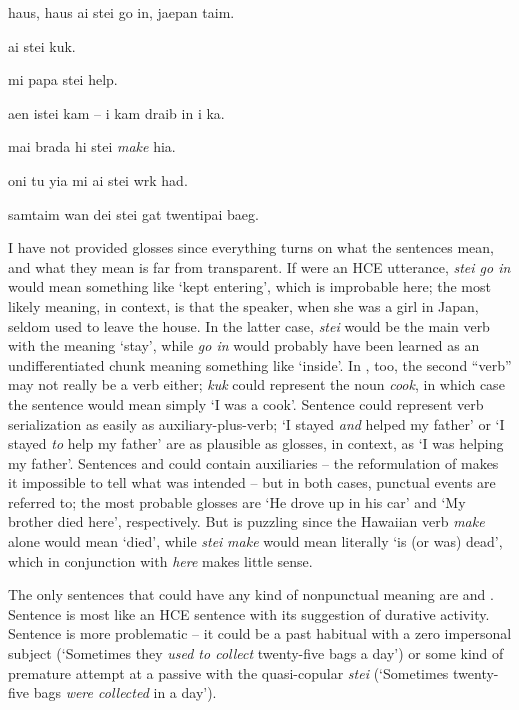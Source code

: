 \ea\label{ex:45}
 haus, haus ai stei go in, jaepan taim.
\z

\ea\label{ex:46}
 ai stei kuk.
\z

\ea\label{ex:47}
 mi papa stei help.
\z

\ea\label{ex:48}
 aen istei kam -- i kam draib in i ka.
\z

\ea\label{ex:49}
 mai brada hi stei \textit{make} hia.
\z

\ea\label{ex:50}
oni tu yia mi ai stei wrk had.
\z

\ea\label{ex:51}
samtaim wan dei stei gat twentipai baeg.
\z

\noindent I have not provided glosses since everything turns on what the sentences mean, and what they mean is far from transparent. If  were an HCE utterance, \textit{stei go in} would mean something like `kept entering', which is improbable here; the most likely meaning, in context, is that the speaker, when she was a girl in Japan, seldom used to leave the house. In the latter case, \textit{stei} would be the main verb with the meaning `stay', while \textit{go in} would probably have been learned as an undifferentiated chunk meaning something like `inside'. In , too, the second ``verb'' may not really be a verb either; \textit{kuk} could represent the noun \textit{cook}, in which case the sentence would mean simply `I was a cook'. Sentence  could represent verb serialization as easily as auxiliary-plus-verb; `I stayed \textit{and} helped my father' or `I stayed \textit{to} help my father' are as plausible as glosses, in context, as `I was helping my father'. Sentences  and  could contain auxiliaries -- the reformu\-lation of  makes it impossible to tell what was intended -- but in both cases, punctual events are referred to; the most probable glosses are `He drove up in his car' and `My brother died here', respectively. But  is puzzling since the Hawaiian verb \textit{make} alone would mean `died', while \textit{stei} \textit{make} would mean literally `is (or was) dead', which in conjunction with \textit{here} makes little sense.


The only sentences that could have any kind of nonpunctual meaning are  and . Sentence  is most like an HCE sentence with its suggestion of durative activity. Sentence  is more problematic -- it could be a past habitual with a zero impersonal subject (`Some\-times they \textit{used to collect} twenty-five bags a day') or some kind of premature attempt at a passive with the quasi-copular \textit{stei} (`Sometimes twenty-five bags \textit{were collected} in a day').


